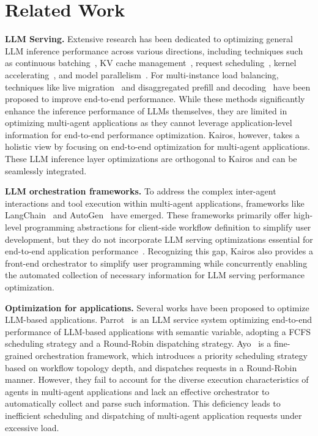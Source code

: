 \documentclass[sigplan,nonacm]{acmart}
\newcommand{\system}{Kairos}
\begin{document}
\section{Related Work}
\textbf{LLM Serving.} Extensive research has been dedicated to optimizing general LLM inference performance across various directions, including techniques such as continuous batching~\cite{280922,kwon2023efficient}, KV cache management~\cite{lin2024infinitellmefficientllmservice, sheng2024sloraservingthousandsconcurrent, kwon2023efficient,zheng2024sglangefficientexecutionstructured}, request scheduling~\cite{298679,10.5555/3691938.3691990}, kernel accelerating~\cite{10.5555/3600270.3601459,10.5555/3618408.3619993}, and model parallelism~\cite{288582,10.1145/3620665.3640411}. For multi-instance load balancing, techniques like live migration~\cite{298685} and disaggregated prefill and decoding~\cite{298687,305212} have been proposed to improve end-to-end performance.
While these methods significantly enhance the inference performance of LLMs themselves, they are limited in optimizing multi-agent applications as they cannot leverage application-level information for end-to-end performance optimization. \system{}, however, takes a holistic view by focusing on end-to-end optimization for multi-agent applications. These LLM inference layer optimizations are orthogonal to \system{} and can be seamlessly integrated.

\textbf{LLM orchestration frameworks.} To address the complex inter-agent interactions and tool execution within multi-agent applications, frameworks like LangChain~\cite{langchain} and AutoGen~\cite{wu2023autogenenablingnextgenllm} have emerged. These frameworks primarily offer high-level programming abstractions for client-side workflow definition to simplify user development, but they do not incorporate LLM serving optimizations essential for end-to-end application performance~\cite{crewAI,langgraph,camle,langflow,zhou2023agentsopensourceframeworkautonomous}. Recognizing this gap, \system{} also provides a front-end orchestrator to simplify user programming while concurrently enabling the automated collection of necessary information for LLM serving performance optimization.

\textbf{Optimization for applications.} Several works have been proposed to optimize LLM-based applications. 
Parrot~\cite{10.5555/3691938.3691988} is an LLM service system optimizing end-to-end performance of LLM-based applications with semantic variable, adopting a FCFS scheduling strategy and a Round-Robin dispatching strategy.
Ayo~\cite{10.1145/3676641.3716278} is a fine-grained orchestration framework, which introduces a priority scheduling strategy based on workflow topology depth, and dispatches requests in a Round-Robin manner.
However, they fail to account for the diverse execution characteristics of agents in multi-agent applications and lack an effective orchestrator to automatically collect and parse such information. This deficiency leads to inefficient scheduling and dispatching of multi-agent application requests under excessive load.
\end{document}
